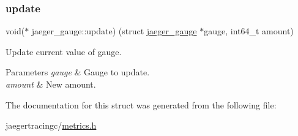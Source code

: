 \subsubsection{\texorpdfstring{update}{update}}
{\footnotesize\ttfamily void($\ast$ jaeger\+\_\+gauge\+::update) (struct \mbox{\hyperlink{structjaeger__gauge}{jaeger\+\_\+gauge}} $\ast$gauge, int64\+\_\+t amount)}



Update current value of gauge. 


\begin{DoxyParams}{Parameters}
{\em gauge} & Gauge to update. \\
\hline
{\em amount} & New amount. \\
\hline
\end{DoxyParams}


The documentation for this struct was generated from the following file\+:\begin{DoxyCompactItemize}
\item 
jaegertracingc/\mbox{\hyperlink{metrics_8h}{metrics.\+h}}\end{DoxyCompactItemize}
